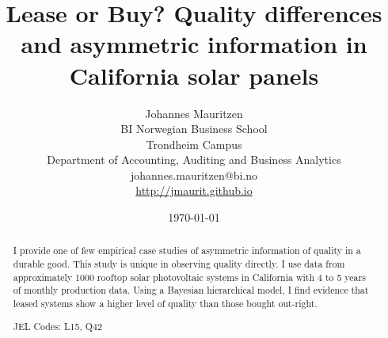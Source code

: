 \documentclass[12pt]{article}
\title{Lease or Buy? Quality differences and asymmetric information in California solar panels}
\date{\today}
\author{Johannes Mauritzen \\ BI Norwegian Business School \\ Trondheim Campus \\ Department of Accounting, Auditing and Business Analytics \\ johannes.mauritzen@bi.no\\\url{http://jmaurit.github.io}}
\begin{document}
 \begin{spacing}{1} %
	\maketitle

\begin{abstract}
 I provide one of few empirical case studies of asymmetric information of quality in a durable good. This study is unique in observing quality directly. I use data from approximately 1000 rooftop solar photovoltaic systems in California with 4 to 5 years of monthly production data. Using a Bayesian hierarchical model, I find evidence that leased systems show a higher level of quality than those bought out-right. 

 JEL Codes: L15, Q42
\end{abstract}

% 
 \end{spacing}
 
\end{document}
